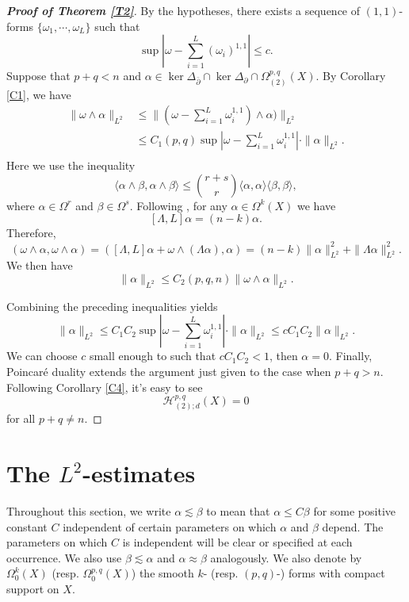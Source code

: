 \documentclass[12pt, twoside]{article}
\theoremstyle{definition}
\numberwithin{equation}{section}
\def \a {\alpha }
\def \b {\beta}
\def \De {\Delta}
\def \La {\Lambda}
\def\w {\omega}
\def\Om{\Omega}
\def\pa{\partial}
\begin{document}
	\begin{proof}[\textbf{Proof of Theorem \ref{T2}}]
		By the hypotheses, there exists a sequence of $(1,1)$-forms $\{\w_{1},\cdots,\w_{L}\}$ such that 
		$$\sup|\w-\sum_{i=1}^{L}(\w_{i})^{1,1}|\leq c.$$	
		Suppose that $p+q<n$ and $\a\in\ker{\De_{\bar{\pa}}}\cap\ker{\De_{\pa}}\cap\Om^{p,q}_{(2)}(X)$. By Corollary \ref{C1}, we have
		\begin{equation*}
		\begin{split}
		\|\w\wedge\a\|_{L^2}&\leq\|(\w-\sum_{i=1}^{L}\w^{1,1}_{i})\wedge\a)\|_{L^2}\\
		&\leq C_{1}(p,q)\sup|\w-\sum_{i=1}^{L}\w^{1,1}_{i}|\cdot\|\a\|_{L^2}.\\
		\end{split}
		\end{equation*}
		Here we use the inequality
		$$\langle\a\wedge\b,\a\wedge\b\rangle\leq\binom{r+s}{r}\langle\a,\a\rangle\langle\b,\b\rangle,$$
		where $\a\in\Om^{r}$ and $\b\in\Om^{s}$. Following \cite[Corollary 1.2.28]{Huy}, for any $\a\in\Om^{k}(X)$ we have
		$$[\La,L]\a=(n-k)\a.$$ 
		Therefore,
		$$
		(\w\wedge\a,\w\wedge\a)=([\La,L]\a+\w\wedge(\La\a),\a)=(n-k)\|\a\|_{L^2}^{2}+\|\La\a\|_{L^2}^{2}.
		$$
		We then have
		$$\|\a\|_{L^2}\leq C_{2}(p,q,n)\|\w\wedge\a\|_{L^2}.$$
		
		Combining the preceding inequalities yields
		$$\|\a\|_{L^2}\leq C_{1}C_{2}\sup|\w-\sum_{i=1}^{L}\w^{1,1}_{i}|\cdot\|\a\|_{L^2}\leq cC_{1}C_{2}\|\a\|_{L^2}.$$
		We can choose $c$ small enough to such that $cC_{1}C_{2}<1$, then $\a=0$.  Finally, Poincar\'{e} duality extends the argument just given to the case when $p+q>n$. Following Corollary \ref{C4}, it's easy to see $$\mathcal{H}^{p,q}_{(2);d}(X)=0$$
		for all $p+q\neq n$. 
	\end{proof}	
	
	


	\section{The $L^{2}$-estimates}



	Throughout this section, we write $\a\lesssim\b$ to mean that $\a\leq C\b$ for some positive constant $C$ independent of certain parameters on which $\a$ and $\b$ depend. The parameters on which $C$ is independent will be clear or specified at each occurrence. We also use $\b\lesssim\a$ and $\a\approx\b$ analogously. We also denote by $\Om^{k}_{0}(X)$ (resp. $\Om^{p,q}_{0}(X)$) the smooth $k$- (resp. $(p, q)$-) forms with compact support on $X$.
\end{document}
